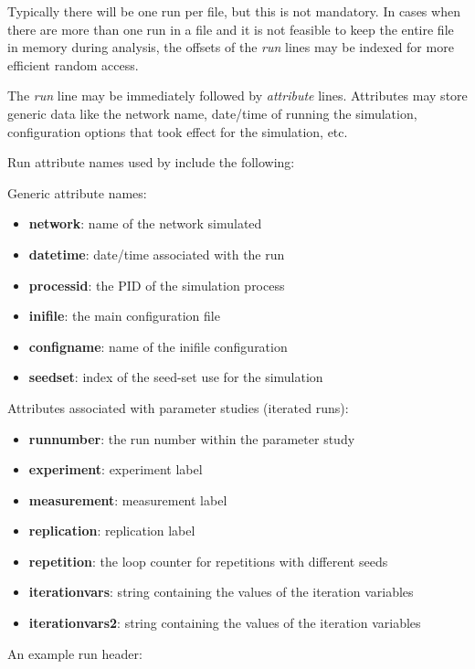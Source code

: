 Typically there will be one run per file, but this is not mandatory.
In cases when there are more than one run in a file and it is not feasible
to keep the entire file in memory during analysis, the offsets of the \textit{run}
lines may be indexed for more efficient random access.

The \textit{run} line may be immediately followed by \textit{attribute} lines.
Attributes may store generic data like the network name, date/time of running
the simulation, configuration options that took effect for the simulation, etc.

Run attribute names used by {\opp} include the following:

Generic attribute names:

\begin{itemize}
    \item \textbf{network}: name of the network simulated
    \item \textbf{datetime}: date/time associated with the run
    \item \textbf{processid}: the PID of the simulation process
    \item \textbf{inifile}: the main configuration file
    \item \textbf{configname}: name of the inifile configuration
    \item \textbf{seedset}: index of the seed-set use for the simulation
\end{itemize}

Attributes associated with parameter studies (iterated runs):

\begin{itemize}
    \item \textbf{runnumber}: the run number within the parameter study
    \item \textbf{experiment}: experiment label
    \item \textbf{measurement}: measurement label
    \item \textbf{replication}: replication label
    \item \textbf{repetition}: the loop counter for repetitions with different seeds
    \item \textbf{iterationvars}: string containing the values of the iteration variables
    \item \textbf{iterationvars2}: string containing the values of the iteration variables
\end{itemize}


An example run header:

